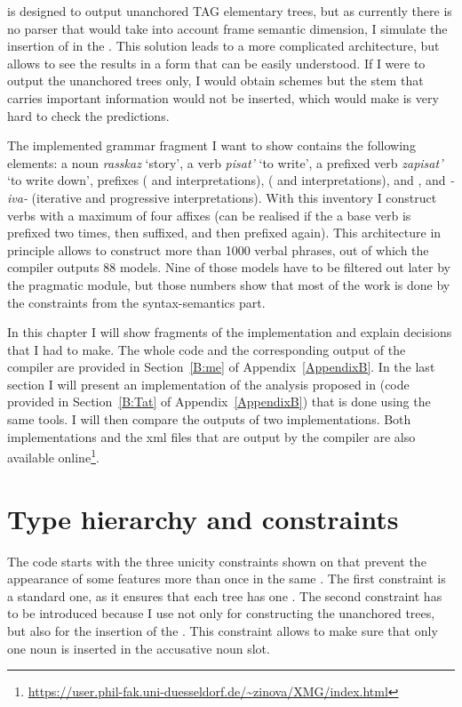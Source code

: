  is designed to output unanchored TAG elementary trees, but as currently there is no parser that would take into account frame semantic dimension, I simulate the insertion of  in the . This solution leads to a more complicated  architecture, but allows to see the results in a form that can be easily understood. If I were to output the unanchored trees only, I would obtain  schemes but the stem that carries important information would not be inserted, which would make is very hard to check the predictions. 


The implemented grammar fragment I want to show contains the following elements: a noun \textit{rasskaz} `story', a verb \textit{pisat'} `to write', a prefixed verb \textit{zapisat'} `to write down', prefixes  ( and  interpretations),  ( and  interpretations), and , and  \textit{-iva-} (iterative and progressive interpretations).  With this inventory I construct verbs with a maximum of four affixes (can be realised if the a base verb is prefixed two times, then suffixed, and then prefixed again). This architecture in principle allows to construct more than 1000 verbal phrases, out of which the compiler outputs 88 models. Nine of those models have to be filtered out later by the pragmatic module, but those numbers show that most of the work is done by the constraints from the syntax-semantics part.

In this chapter I will show fragments of the implementation and explain decisions that I had to make. The whole code and the corresponding output of the compiler are provided in Section~\ref{B:me} of Appendix~\ref{AppendixB}. In the last section I will present an implementation of the analysis proposed in \citet{Tatevosov:09} (code provided in Section~\ref{B:Tat} of Appendix~\ref{AppendixB}) that is done using the same tools. I will then compare the outputs of two implementations. Both implementations and the xml files that are output by the compiler are also available online\footnote{\url{https://user.phil-fak.uni-duesseldorf.de/~zinova/XMG/index.html}}.

\section{Type hierarchy and constraints}
The code starts with the three unicity constraints shown on  that prevent the appearance of some features more than once in the same . The first constraint is a standard one, as it ensures that each tree has one . The second constraint has to be introduced because I use  not only for constructing the unanchored trees, but also for the insertion of the . This constraint allows to make sure that only one noun is inserted in the accusative noun slot.

